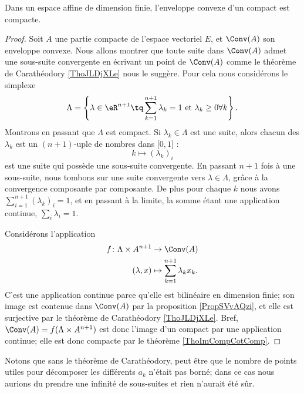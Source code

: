 \begin{corollary}   \label{CorOFrXzIf}
    Dans un espace affine de dimension finie, l'enveloppe convexe d'un compact est compacte.
\end{corollary}

\begin{proof}
    Soit \( A\) une partie compacte de l'espace vectoriel \( E\), et \( \Conv(A)\) son enveloppe convexe. Nous allons montrer que toute suite dans \( \Conv(A)\) admet une sous-suite convergente en écrivant un point de \( \Conv(A)\) comme le théorème de Carathéodory \ref{ThoJLDjXLe} nous le suggère. Pour cela nous considérons le simplexe
    \begin{equation}
        \Lambda=\left\{  \lambda\in \eR^{n+1}\tq \sum_{k=1}^{n+1}\lambda_k=1\text{ et } \lambda_k\geq 0\forall k   \right\}.    
    \end{equation}
    Montrons en passant que \( \Lambda\) est compact. Si \( \lambda_k\in \Lambda\) est une suite, alors chacun des \( \lambda_k\) est un \( (n+1)\)-uple de nombres dans \( \mathopen[ 0 , 1 \mathclose]\) :
    \begin{equation}
        k\mapsto (\lambda_k)_i
    \end{equation}
    est une suite qui possède une sous-suite convergente. En passant \( n+1\) fois à une sous-suite, nous tombons sur une suite convergente vers \( \lambda\in\Lambda\), grâce à la convergence composante par composante. De plus pour chaque \( k\) nous avons \( \sum_{i=1}^{n+1}(\lambda_k)_i=1\), et en passant à la limite, la somme étant une application continue, \( \sum_{i}\lambda_i=1\).

    Considérons l'application
    \begin{equation}
        \begin{aligned}
            f\colon \Lambda\times A^{n+1}&\to \Conv(A) \\
            (\lambda,x)&\mapsto \sum_{k=1}^{n+1}\lambda_kx_k. 
        \end{aligned}
    \end{equation}
    C'est une application continue parce qu'elle est bilinéaire en dimension finie; son image est contenue dans \( \Conv(A)\) par la proposition \ref{PropSVvAQzi}, et elle est surjective par le théorème de Carathéodory \ref{ThoJLDjXLe}. Bref, \( \Conv(A)=f(\Lambda\times A^{n+1})\) est donc l'image d'un compact par une application continue; elle est donc compacte par le théorème \ref{ThoImCompCotComp}.
\end{proof}
Notons que sans le théorème de Carathéodory, peut être que le nombre de points utiles pour décomposer les différents \( a_k\) n'était pas borné; dans ce cas nous aurions du prendre une infinité de sous-suites et rien n'aurait été sûr.


